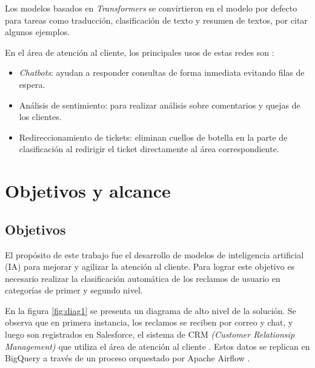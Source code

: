 
Los modelos basados en \textit{Transformers} se convirtieron en el modelo por defecto para tareas como traducción, clasificación de texto y resumen de textos, por citar algunos ejemplos.

En el área de atención al cliente, los principales usos de estas redes son \citep{WEBSITE:15}:
\begin{itemize}
\item \textit{Chatbots}: ayudan a responder consultas de forma inmediata evitando filas de espera.
\item Análisis de sentimiento: para realizar análisis sobre comentarios y quejas de los clientes.
\item Redireccionamiento de tickets: eliminan cuellos de botella en la parte de clasificación al redirigir el ticket directamente al área correspondiente.
\end{itemize}


\section{Objetivos y alcance}

\subsection{Objetivos}

El propósito de este trabajo fue el desarrollo de modelos de inteligencia artificial (IA) para mejorar y agilizar la atención al cliente. Para lograr este objetivo es necesario realizar la clasificación automática de los reclamos de usuario en categorías de primer y segundo nivel.

En la figura \ref{fig:diag1} se presenta un diagrama de alto nivel de la solución. Se observa que en primera instancia, los reclamos se reciben por correo y chat, y luego son registrados en Salesforce, el sistema de CRM \textit{(Customer Relationsip Management)} que utiliza el área de atención al cliente \citep{WEBSITE:29}. Estos datos se replican en BigQuery a través de un proceso orquestado por Apache Airflow \citep{WEBSITE:30} \citep{WEBSITE:31}.

